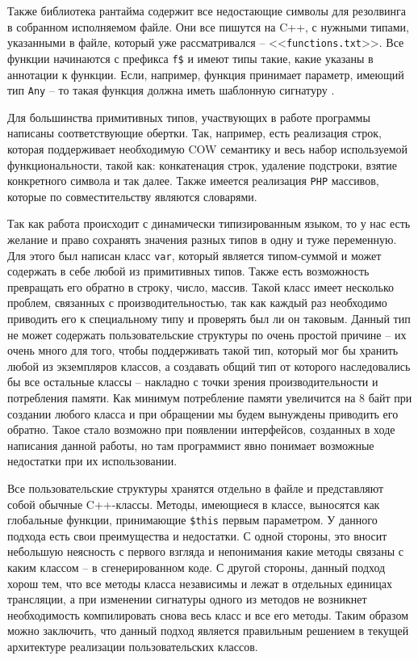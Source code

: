 Также библиотека рантайма содержит все недостающие символы для резолвинга в собранном исполняемом файле.
Они все пишутся на C++, с нужными типами, указанными в файле, который уже рассматривался -- <<\verb|functions.txt|>>.
Все функции начинаются с префикса \verb|f$| и имеют типы такие, какие указаны в аннотации к функции.
Если, например, функция принимает параметр, имеющий тип \verb|Any| -- то такая функция должна иметь шаблонную сигнатуру \cite[с.~665]{Stroustrup}.

Для большинства примитивных типов, участвующих в работе программы написаны соответствующие обертки.
Так, например, есть реализация строк, которая поддерживает необходимую COW \cite{COW} семантику и весь набор используемой функциональности, такой как: конкатенация строк, удаление подстроки, взятие конкретного символа и так далее.
Также имеется реализация \verb|PHP| массивов, которые по совместительству являются словарями.

Так как работа происходит с динамически типизированным языком, то у нас есть желание и право сохранять значения разных типов в одну и туже переменную.
Для этого был написан класс \verb|var|, который является типом-суммой и может содержать в себе любой из примитивных типов.
Также есть возможность превращать его обратно в строку, число, массив.
Такой класс имеет несколько проблем, связанных с производительностью, так как каждый раз необходимо приводить его к специальному типу и проверять был ли он таковым.
Данный тип не может содержать пользовательские структуры по очень простой причине -- их очень много для того, чтобы поддерживать такой тип, который мог бы хранить любой из экземпляров классов, а создавать общий тип от которого наследовались бы все остальные классы -- накладно с точки зрения производительности и потребления памяти.
Как минимум потребление памяти увеличится на 8 байт при создании любого класса и при обращении мы будем вынуждены приводить его обратно.
Такое стало возможно при появлении интерфейсов, созданных в ходе написания данной работы, но там программист явно понимает возможные недостатки при их использовании.

Все пользовательские структуры хранятся отдельно в файле и представляют собой обычные C++-классы.
Методы, имеющиеся в классе, выносятся как глобальные функции, принимающие \verb|$this| первым параметром.
У данного подхода есть свои преимущества и недостатки.
С одной стороны, это вносит небольшую неясность с первого взгляда и непонимания какие методы связаны с каким классом -- в сгенерированном коде.
С другой стороны, данный подход хорош тем, что все методы класса независимы и лежат в отдельных единицах трансляции, а при изменении сигнатуры одного из методов не возникнет необходимость компилировать снова весь класс и все его методы.
Таким образом можно заключить, что данный подход является правильным решением в текущей архитектуре реализации пользовательских классов.

